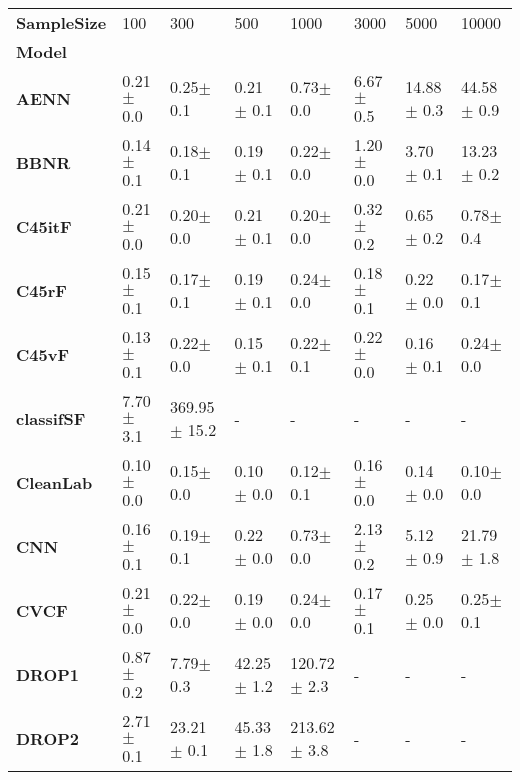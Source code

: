 \begin{tabular}{llllllll}
\toprule
\textbf{SampleSize} &           100   &             300   &              500   &            1000  &             3000  &             5000  &             10000 \\
\textbf{Model           } &                 &                   &                    &                  &                   &                   &                   \\
\midrule
\textbf{AENN            } &   0.21$\pm$ 0.0 &     0.25$\pm$ 0.1 &      0.21$\pm$ 0.1 &    0.73$\pm$ 0.0 &     6.67$\pm$ 0.5 &    14.88$\pm$ 0.3 &    44.58$\pm$ 0.9 \\
\textbf{BBNR            } &   0.14$\pm$ 0.1 &     0.18$\pm$ 0.1 &      0.19$\pm$ 0.1 &    0.22$\pm$ 0.0 &     1.20$\pm$ 0.0 &     3.70$\pm$ 0.1 &    13.23$\pm$ 0.2 \\
\textbf{C45itF          } &   0.21$\pm$ 0.0 &     0.20$\pm$ 0.0 &      0.21$\pm$ 0.1 &    0.20$\pm$ 0.0 &     0.32$\pm$ 0.2 &     0.65$\pm$ 0.2 &     0.78$\pm$ 0.4 \\
\textbf{C45rF           } &   0.15$\pm$ 0.1 &     0.17$\pm$ 0.1 &      0.19$\pm$ 0.1 &    0.24$\pm$ 0.0 &     0.18$\pm$ 0.1 &     0.22$\pm$ 0.0 &     0.17$\pm$ 0.1 \\
\textbf{C45vF           } &   0.13$\pm$ 0.1 &     0.22$\pm$ 0.0 &      0.15$\pm$ 0.1 &    0.22$\pm$ 0.1 &     0.22$\pm$ 0.0 &     0.16$\pm$ 0.1 &     0.24$\pm$ 0.0 \\
\textbf{classifSF       } &   7.70$\pm$ 3.1 &  369.95$\pm$ 15.2 &                  - &                - &                 - &                 - &                 - \\
\textbf{CleanLab        } &   0.10$\pm$ 0.0 &     0.15$\pm$ 0.0 &      0.10$\pm$ 0.0 &    0.12$\pm$ 0.1 &     0.16$\pm$ 0.0 &     0.14$\pm$ 0.0 &     0.10$\pm$ 0.0 \\
\textbf{CNN             } &   0.16$\pm$ 0.1 &     0.19$\pm$ 0.1 &      0.22$\pm$ 0.0 &    0.73$\pm$ 0.0 &     2.13$\pm$ 0.2 &     5.12$\pm$ 0.9 &    21.79$\pm$ 1.8 \\
\textbf{CVCF            } &   0.21$\pm$ 0.0 &     0.22$\pm$ 0.0 &      0.19$\pm$ 0.0 &    0.24$\pm$ 0.0 &     0.17$\pm$ 0.1 &     0.25$\pm$ 0.0 &     0.25$\pm$ 0.1 \\
\textbf{DROP1           } &   0.87$\pm$ 0.2 &     7.79$\pm$ 0.3 &     42.25$\pm$ 1.2 &  120.72$\pm$ 2.3 &                 - &                 - &                 - \\
\textbf{DROP2           } &   2.71$\pm$ 0.1 &    23.21$\pm$ 0.1 &     45.33$\pm$ 1.8 &  213.62$\pm$ 3.8 &                 - &                 - &                 - \\

\end{tabular}
